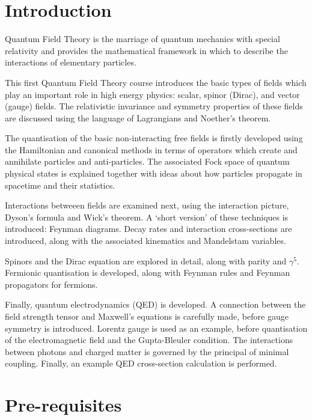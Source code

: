 \documentclass[a4paper,11pt]{article}
\begin{document}
	\maketitlepage
	\preliminaries

	\section*{Introduction}
	
	\noindent Quantum Field Theory is the marriage of quantum mechanics with special relativity and provides the mathematical framework in which to describe the interactions of elementary particles.

	\noindent This first Quantum Field Theory course introduces the basic types of fields which play an important role in high energy physics: scalar, spinor (Dirac), and vector (gauge) fields. The relativistic invariance and symmetry properties of these fields are discussed using the language of Lagrangians and Noether’s theorem.

	\noindent The quantisation of the basic non-interacting free fields is firstly developed using the Hamiltonian and canonical methods in terms of operators which create and annihilate particles and anti-particles. The associated Fock space of quantum physical states is explained together with ideas about how particles propagate in spacetime and their statistics.

	\noindent Interactions betweeen fields are examined next, using the interaction picture, Dyson’s formula and Wick’s theorem. A ‘short version’ of these techniques is introduced: Feynman diagrams. Decay rates and interaction cross-sections are introduced, along with the associated kinematics and Mandelstam variables.

	\noindent Spinors and the Dirac equation are explored in detail, along with parity and $\gamma^{5}$. Fermionic quantisation is developed, along with Feynman rules and Feynman propagators for fermions.

	\noindent Finally, quantum electrodynamics (QED) is developed. A connection between the field strength tensor and Maxwell’s equations is carefully made, before gauge symmetry is introduced. Lorentz gauge is used as an example, before quantisation of the electromagnetic field and the Gupta-Bleuler condition. The interactions between photons and charged matter is governed by the principal of minimal coupling. Finally, an example QED cross-section calculation is performed.

	\section*{Pre-requisites}
\end{document}
